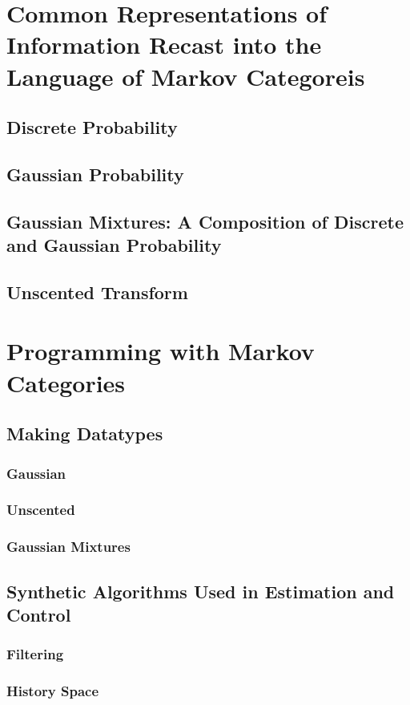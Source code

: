 \chapter{Common Representations of Information Recast into the Language of Markov Categoreis}
\section{Discrete Probability}
\section{Gaussian Probability}
\section{Gaussian Mixtures: A Composition of Discrete and Gaussian Probability}
\section{Unscented Transform}

\chapter{Programming with Markov Categories}
\section{Making Datatypes}
\subsection{Gaussian}
\subsection{Unscented}
\subsection{Gaussian Mixtures}

\section{Synthetic Algorithms Used in Estimation and Control}
\subsection{Filtering}
\subsection{History Space}


